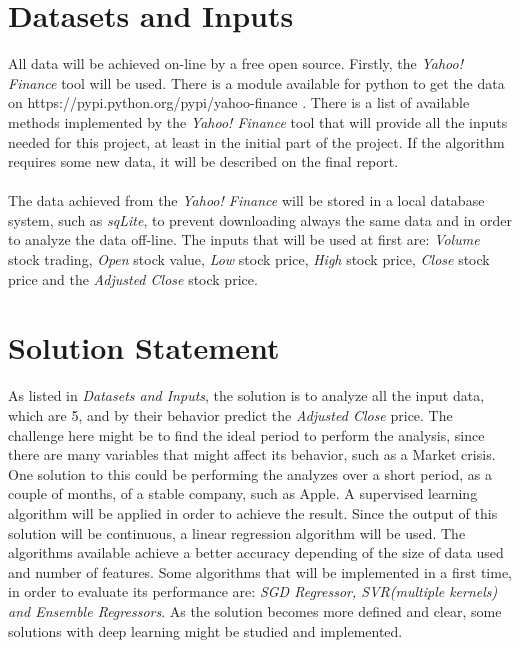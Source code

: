 \documentclass[a4paper, 11pt]{article}
\begin{document}
\section*{Datasets and Inputs}
All data will be achieved on-line by a free open source. Firstly, the \emph{Yahoo! Finance} tool will be used. There is a module available for python to get the data on https://pypi.python.org/pypi/yahoo-finance .
There is a list of available methods implemented by the \emph{Yahoo! Finance} tool that will provide all the inputs needed for this project, at least in the initial part of the project. If the algorithm requires some
new data, it will be described on the final report.\\
\newline 
\\
The data achieved from the \emph{Yahoo! Finance} will be stored in a local database system, such as \emph{sqLite}, to prevent downloading always the same data and in order to analyze the data off-line.
The inputs that will be used at first are: \emph{Volume} stock trading, \emph{Open} stock value, \emph{Low} stock price, \emph{High} stock price, \emph{Close} stock price and the \emph{Adjusted Close} stock price.\\

\section*{Solution Statement}
As listed in \emph{Datasets and Inputs}, the solution is to analyze all the input data, which are 5, and by their behavior predict the  \emph{Adjusted Close} price.
The challenge here might be to find the ideal period to perform the analysis, since there are many variables that might affect its behavior, such as a Market crisis. One solution to this 
could be performing the analyzes over a short period, as a couple of months, of a stable company, such as Apple.
A supervised learning algorithm will be applied in order to achieve the result. Since the output of this solution will be continuous, a linear regression algorithm will be used.
The algorithms available achieve a better accuracy depending of the size of data used and number of features. Some algorithms that will be implemented in a first time, in order to 
evaluate its performance are: \emph{SGD Regressor, SVR(multiple kernels) and Ensemble Regressors}. As the solution becomes more defined and clear, some solutions with deep learning might
be studied and implemented.\\
\end{document}
